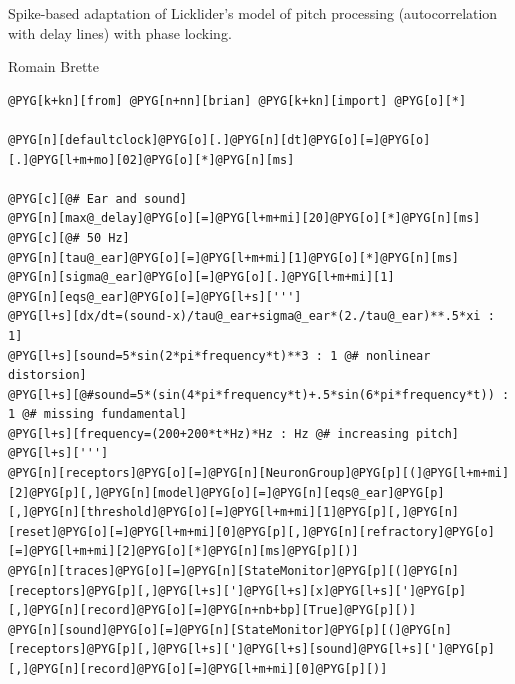 \documentclass[letterpaper,10pt,english]{manual}
\begin{document}
Spike-based adaptation of Licklider's model of pitch processing (autocorrelation with
delay lines) with phase locking.

Romain Brette

\begin{Verbatim}[commandchars=@\[\]]
@PYG[k+kn][from] @PYG[n+nn][brian] @PYG[k+kn][import] @PYG[o][*]

@PYG[n][defaultclock]@PYG[o][.]@PYG[n][dt]@PYG[o][=]@PYG[o][.]@PYG[l+m+mo][02]@PYG[o][*]@PYG[n][ms]

@PYG[c][@# Ear and sound]
@PYG[n][max@_delay]@PYG[o][=]@PYG[l+m+mi][20]@PYG[o][*]@PYG[n][ms] @PYG[c][@# 50 Hz]
@PYG[n][tau@_ear]@PYG[o][=]@PYG[l+m+mi][1]@PYG[o][*]@PYG[n][ms]
@PYG[n][sigma@_ear]@PYG[o][=]@PYG[o][.]@PYG[l+m+mi][1]
@PYG[n][eqs@_ear]@PYG[o][=]@PYG[l+s][''']
@PYG[l+s][dx/dt=(sound-x)/tau@_ear+sigma@_ear*(2./tau@_ear)**.5*xi : 1]
@PYG[l+s][sound=5*sin(2*pi*frequency*t)**3 : 1 @# nonlinear distorsion]
@PYG[l+s][@#sound=5*(sin(4*pi*frequency*t)+.5*sin(6*pi*frequency*t)) : 1 @# missing fundamental]
@PYG[l+s][frequency=(200+200*t*Hz)*Hz : Hz @# increasing pitch]
@PYG[l+s][''']
@PYG[n][receptors]@PYG[o][=]@PYG[n][NeuronGroup]@PYG[p][(]@PYG[l+m+mi][2]@PYG[p][,]@PYG[n][model]@PYG[o][=]@PYG[n][eqs@_ear]@PYG[p][,]@PYG[n][threshold]@PYG[o][=]@PYG[l+m+mi][1]@PYG[p][,]@PYG[n][reset]@PYG[o][=]@PYG[l+m+mi][0]@PYG[p][,]@PYG[n][refractory]@PYG[o][=]@PYG[l+m+mi][2]@PYG[o][*]@PYG[n][ms]@PYG[p][)]
@PYG[n][traces]@PYG[o][=]@PYG[n][StateMonitor]@PYG[p][(]@PYG[n][receptors]@PYG[p][,]@PYG[l+s][']@PYG[l+s][x]@PYG[l+s][']@PYG[p][,]@PYG[n][record]@PYG[o][=]@PYG[n+nb+bp][True]@PYG[p][)]
@PYG[n][sound]@PYG[o][=]@PYG[n][StateMonitor]@PYG[p][(]@PYG[n][receptors]@PYG[p][,]@PYG[l+s][']@PYG[l+s][sound]@PYG[l+s][']@PYG[p][,]@PYG[n][record]@PYG[o][=]@PYG[l+m+mi][0]@PYG[p][)]


\end{Verbatim}
\end{document}
